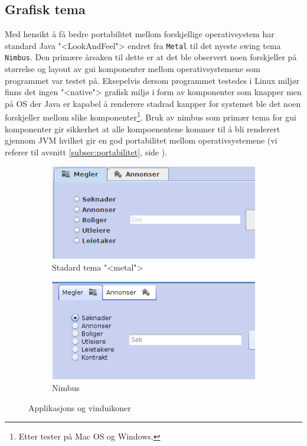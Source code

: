 \subsection{Grafisk tema}
Med hensikt å få bedre portabilitet mellom forskjellige operativsystem har standard Java "<LookAndFeel"> endret fra \texttt{Metal} til det nyeste swing tema \texttt{Nimbus}. Den primære årsaken til dette er at det ble observert noen forskjeller på størrelse og layout av gui komponenter mellom operativsystemene som programmet var testet på. Eksepelvis dersom programmet testedes i Linux miljør finns det ingen "<native"> grafisk miljø i form av komponenter som knapper men på OS der Java er kapabel å renderere stadrad kanpper for systemet ble det noen forskjeller mellom slike komponenter\footnote{Etter tester på Mac OS og Windows.}. Bruk av nimbus som primær tema for gui komponenter gir sikkerhet at alle kompoenentene kommer til å bli renderert gjennom JVM hvilket gir en god portabilitet mellom operativsystemene (vi referer til avsnitt \ref{subsec:portabilitet}, side \pageref{subsec:portabilitet}).

\begin{figure}[ht!]
\centering
\begin{subfigure}[b]{0.4\textwidth}
\centering
\includegraphics[scale=0.5]{./img/produktdokumentasjon/visuelle_detaljer/metal.png}
\caption{Stadard tema "<metal">}
\end{subfigure}

\begin{subfigure}[b]{0.4\textwidth}
\centering
\includegraphics[scale=0.5]{./img/produktdokumentasjon/visuelle_detaljer/nimbus.png}
\caption{Nimbus}
\end{subfigure}
\caption{Applikasjons og vinduikoner}\label{fig:tema}
\end{figure}